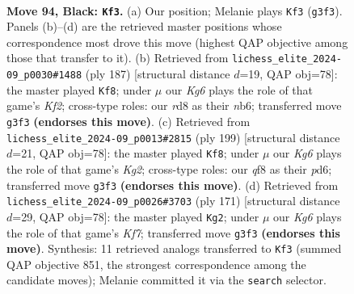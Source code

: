 \documentclass[11pt]{article}
\begin{document}
\clearpage

\begin{figure}[p]\centering
\begin{subfigure}{0.46\textwidth}\centering
\resizebox{\linewidth}{!}{%
\newchessgame
\chessboard[
  setfen={3R1Q2/8/8/5B2/8/6k1/7Q/7K b - - 2 94},
  showmover=false,
  pgfstyle=straightmove, color=movearrow, markmove={g3-f3}
]}
\caption{}
\end{subfigure}\hfill
\begin{subfigure}{0.46\textwidth}\centering
\resizebox{\linewidth}{!}{%
\newchessgame
\chessboard[
  setfen={8/5k2/1N4Q1/5K2/8/8/8/4q3 b - - 19 94},
  showmover=false,
  pgfstyle=straightmove, color=movearrow, markmove={f7-f8}
]}
\caption{}
\end{subfigure}
\\[4pt]
\begin{subfigure}{0.46\textwidth}\centering
\resizebox{\linewidth}{!}{%
\newchessgame
\chessboard[
  setfen={8/3b2k1/3P2Q1/6K1/8/8/8/5r2 b - - 2 100},
  showmover=false,
  pgfstyle=straightmove, color=movearrow, markmove={g7-f8}
]}
\caption{}
\end{subfigure}\hfill
\begin{subfigure}{0.46\textwidth}\centering
\resizebox{\linewidth}{!}{%
\newchessgame
\chessboard[
  setfen={8/8/8/8/5K2/4Q3/5k2/8 b - - 18 86},
  showmover=false,
  pgfstyle=straightmove, color=movearrow, markmove={f2-g2}
]}
\caption{}
\end{subfigure}
\caption{\textbf{Move 94, Black: \texttt{Kf3}.} (a) Our position; Melanie plays \texttt{Kf3} (\texttt{g3f3}). Panels (b)--(d) are the retrieved master positions whose correspondence most drove this move (highest QAP objective among those that transfer to it). (b) Retrieved from \texttt{lichess\_elite\_2024-09\_p0030\#1488} (ply 187) [structural distance $d$=19, QAP obj=78]: the master played \texttt{Kf8}; under $\mu$ our \emph{Kg6} plays the role of that game's \emph{Kf2}; cross-type roles: our \emph{r}d8 as their \emph{n}b6; transferred move \texttt{g3f3} \textbf{(endorses this move)}. (c) Retrieved from \texttt{lichess\_elite\_2024-09\_p0013\#2815} (ply 199) [structural distance $d$=21, QAP obj=78]: the master played \texttt{Kf8}; under $\mu$ our \emph{Kg6} plays the role of that game's \emph{Kg2}; cross-type roles: our \emph{q}f8 as their \emph{p}d6; transferred move \texttt{g3f3} \textbf{(endorses this move)}. (d) Retrieved from \texttt{lichess\_elite\_2024-09\_p0026\#3703} (ply 171) [structural distance $d$=29, QAP obj=78]: the master played \texttt{Kg2}; under $\mu$ our \emph{Kg6} plays the role of that game's \emph{Kf7}; transferred move \texttt{g3f3} \textbf{(endorses this move)}. Synthesis: 11 retrieved analogs transferred to \texttt{Kf3} (summed QAP objective 851, the strongest correspondence among the candidate moves); Melanie committed it via the \texttt{search} selector.}
\label{fig:thought-m187}
\end{figure}
\end{document}
